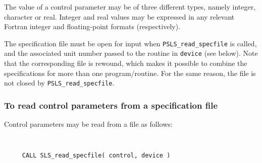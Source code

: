 \documentclass{galahad}
\newcommand{\packagename}{PSLS}
\begin{document}
The value of a control parameter may be of three different types, namely
integer, character or real.
Integer and real values may be expressed in any relevant Fortran integer and
floating-point formats (respectively).

The specification file must be open for
input when {\tt \packagename\_read\_specfile}
is called, and the associated unit number
passed to the routine in {\tt device} (see below).
Note that the corresponding
file is rewound, which makes it possible to combine the specifications
for more than one program/routine.  For the same reason, the file is not
closed by {\tt \packagename\_read\_specfile}.

\subsubsection{To read control parameters from a specification file}
\label{readspec}

Control parameters may be read from a file as follows:
\hskip0.5in

\def\baselinestretch{0.8}
{\tt
\begin{verbatim}
     CALL SLS_read_specfile( control, device )
\end{verbatim}
}
\def\baselinestretch{1.0}
\end{document}
